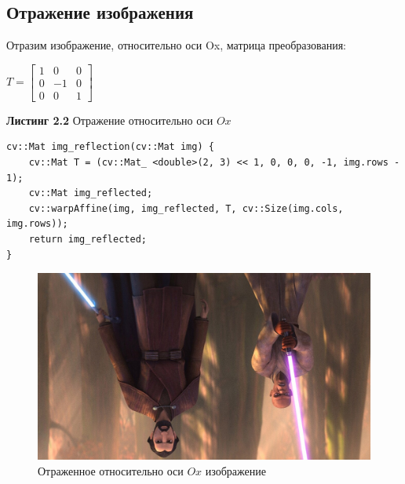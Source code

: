     \subsection{Отражение изображения}
    Отразим изображение, относительно оси Ox, матрица преобразования:
    \begin{center}
        $
        T = 
        \begin{bmatrix}
            1 & 0 & 0\\
            0 & -1 & 0\\
            0 & 0 & 1
        \end{bmatrix}
        $
    \end{center}
    \noindent \textbf{Листинг 2.2} Отражение относительно оси $Ox$
    \begin{lstlisting}
cv::Mat img_reflection(cv::Mat img) {
    cv::Mat T = (cv::Mat_ <double>(2, 3) << 1, 0, 0, 0, -1, img.rows - 1);
    cv::Mat img_reflected;
    cv::warpAffine(img, img_reflected, T, cv::Size(img.cols, img.rows));
    return img_reflected;
}
    \end{lstlisting}
    \begin{figure}[h]
        \centering
        \includegraphics[scale=0.3]{"../images/results/img_reflection.jpg"}
        \caption{Отраженное относительно оси $Ox$ изображение}
    \end{figure}
    \newpage
